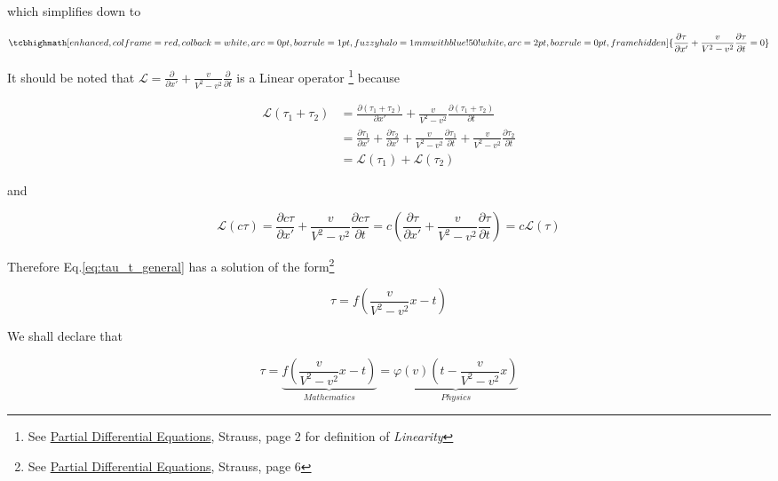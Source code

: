 which simplifies down to

\begin{equation}\label{eq:tau_t_general}
    \tcbhighmath[
        enhanced,colframe=red,colback=white,arc=0pt,boxrule=1pt,
        fuzzy halo=1mm with blue!50!white,
        arc=2pt,
        boxrule=0pt,
        frame hidden
    ]{
        \frac{\partial\tau}{\partial x'} + \frac{v}{V^2 - v^2}\frac{\partial\tau}{\partial t} = 0
    }
\end{equation}

It should be noted that $\mathscr{L} = \frac{\partial}{\partial x'} + \frac{v}{V^2 - v^2}\frac{\partial}{\partial t}$
is a Linear operator
\footnote{See \href{https://trello.com/c/5L46ePJQ}{Partial Differential Equations}, Strauss, page 2 for definition of \textit{Linearity}}
because

\begin{align}
    \mathscr{L}(\tau_1 + \tau_2) &= \frac{\partial(\tau_1 + \tau_2)}{\partial x'} + \frac{v}{V^2 - v^2}\frac{\partial(\tau_1 + \tau_2)}{\partial t} \\
    &= \frac{\partial\tau_1}{\partial x'} + \frac{\partial\tau_2}{\partial x'} + \frac{v}{V^2 - v^2}\frac{\partial\tau_1}{\partial t} + \frac{v}{V^2 - v^2}\frac{\partial\tau_2}{\partial t} \\
    & = \mathscr{L}(\tau_1) + \mathscr{L}(\tau_2)
\end{align}

and

\begin{equation}
    \mathscr{L}(c\tau) = \frac{\partial c\tau}{\partial x'} + \frac{v}{V^2 - v^2}\frac{\partial c\tau}{\partial t} = c\left( \frac{\partial\tau}{\partial x'} + \frac{v}{V^2 - v^2}\frac{\partial\tau}{\partial t} \right) = c\mathscr{L}(\tau)
\end{equation}

Therefore Eq.\ref{eq:tau_t_general} has a solution of the form\footnote{See \href{https://trello.com/c/5L46ePJQ}{Partial Differential Equations}, Strauss, page 6}

\begin{equation}
    \tau = f\left( \frac{v}{V^2 - v^2} x - t \right)
\end{equation}

We shall declare that

\begin{equation}\label{eq:transformation}
    \tau = \underbrace{f\left( \frac{v}{V^2 - v^2} x - t \right)}_{Mathematics} = \underbrace{\varphi(v)\left( t - \frac{v}{V^2 - v^2} x \right)}_{Physics}
\end{equation}

